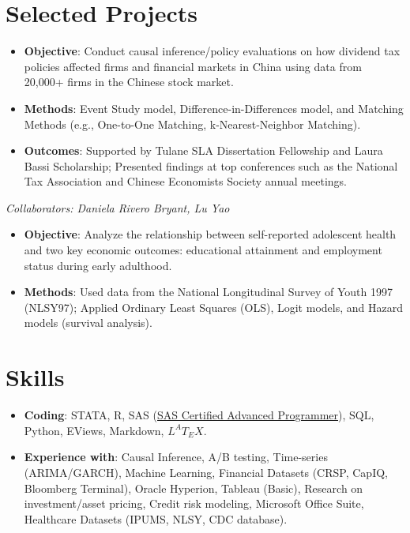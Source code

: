 \documentclass{resume}
\begin{document}
\section{Selected Projects}

\begin{itemize}
    \item \textbf{Objective}: Conduct causal inference/policy evaluations on how dividend tax policies affected firms and financial markets in China using data from 20,000+ firms in the Chinese stock market.
    \item \textbf{Methods}: Event Study model, Difference-in-Differences model, and Matching Methods (e.g., One-to-One Matching, k-Nearest-Neighbor Matching).
    \item \textbf{Outcomes}: Supported by Tulane SLA Dissertation Fellowship and Laura Bassi Scholarship; Presented findings at top conferences such as the National Tax Association and Chinese Economists Society annual meetings.
\end{itemize}

\textit{Collaborators: Daniela Rivero Bryant, Lu Yao}  
\begin{itemize}
    \item \textbf{Objective}: Analyze the relationship between self-reported adolescent health and two key economic outcomes: educational attainment and employment status during early adulthood.
    \item \textbf{Methods}: Used data from the National Longitudinal Survey of Youth 1997 (NLSY97); Applied Ordinary Least Squares (OLS), Logit models, and Hazard models (survival analysis).
\end{itemize}

\section{Skills}
\begin{itemize}[parsep=0.25ex]
    \item \textbf{Coding}: STATA, R, SAS (\href{https://www.youracclaim.com/badges/c4bce10e-7398-4203-9d11-f9c6723749a4/linked_in_profile}{SAS Certified Advanced Programmer}), SQL, Python, EViews, Markdown, $L^{A}T_{E}X$.
    \item \textbf{Experience with}: Causal Inference, A/B testing, Time-series (ARIMA/GARCH), Machine Learning, Financial Datasets (CRSP, CapIQ, Bloomberg Terminal), Oracle Hyperion, Tableau (Basic), Research on investment/asset pricing, Credit risk modeling, Microsoft Office Suite, Healthcare Datasets (IPUMS, NLSY, CDC database).
\end{itemize}
\end{document}
